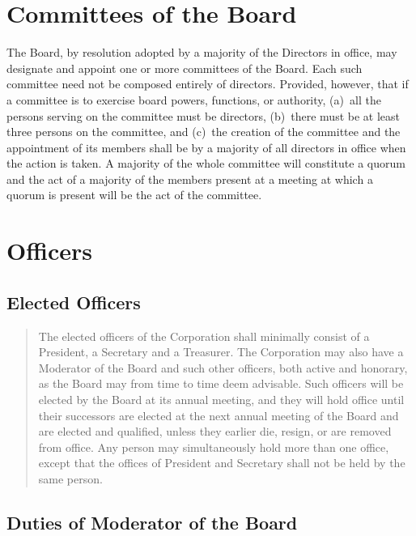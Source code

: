 \documentclass[
]{book}
\begin{document}
\chapter{Committees of the Board}\label{committees-of-the-board}

The Board, by resolution adopted by a majority of the Directors in
office, may designate and appoint one or more committees of the Board.
Each such committee need not be composed entirely of directors.
Provided, however, that if a committee is to exercise board powers,
functions, or authority, (a)~all the persons serving on the committee
must be directors, (b)~there must be at least three persons on the
committee, and (c)~the creation of the committee and the appointment of
its members shall be by a majority of all directors in office when the
action is taken. A majority of the whole committee will constitute a
quorum and the act of a majority of the members present at a meeting at
which a quorum is present will be the act of the committee.

\chapter{Officers}\label{officers}

\section{Elected Officers}\label{elected-officers}

\begin{quote}
The elected officers of the Corporation shall minimally consist of a
President, a Secretary and a Treasurer. The Corporation may also have
a Moderator of the Board and such other officers, both active and
honorary, as the Board may from time to time deem advisable. Such
officers will be elected by the Board at its annual meeting, and they
will hold office until their successors are elected at the next annual
meeting of the Board and are elected and qualified, unless they
earlier die, resign, or are removed from office. Any person may
simultaneously hold more than one office, except that the offices of
President and Secretary shall not be held by the same person.
\end{quote}

\section{Duties of Moderator of the Board}\label{duties-of-moderator-of-the-board}
\end{document}
